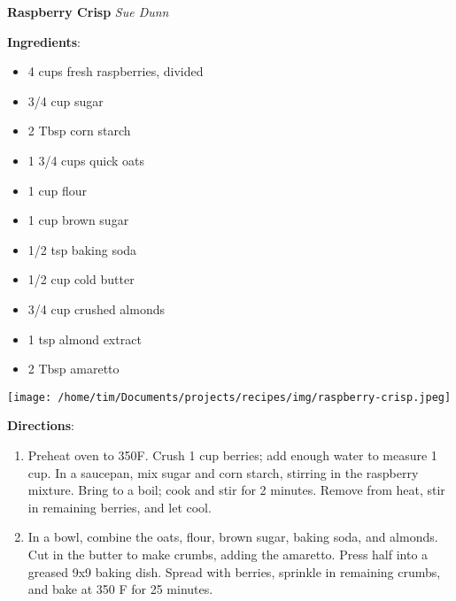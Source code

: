\documentclass[11pt, twoside, openany]{book}
\begin{document}
\noindent\begin{minipage}[t]{\linewidth}%
{\Large\textbf{Raspberry Crisp}} \label{raspberry-crisp}\hfill\textit{Sue Dunn}\\
\noindent\begin{minipage}[t]{0.78\linewidth}%
\textbf{Ingredients}:\vspace{-3mm}
\begin{multicols}{2}
\begin{itemize}\setlength\itemsep{-1mm}
\item 4 cups fresh raspberries, divided
\item 3/4 cup sugar
\item 2 Tbsp corn starch
\item 1 3/4 cups quick oats
\item 1 cup flour
\item 1 cup brown sugar
\item 1/2 tsp baking soda
\item 1/2 cup cold butter
\item 3/4 cup crushed almonds
\item 1 tsp almond extract
\item 2 Tbsp amaretto
\end{itemize}
\end{multicols}
\end{minipage}
\noindent\begin{minipage}[t]{0.18\linewidth}
\centering \strut\vspace*{-\baselineskip}\newline
\texttt{[image: /home/tim/Documents/projects/recipes/img/raspberry-crisp.jpeg]}\\
\end{minipage}\vspace{3mm}
\textbf{Directions}:
\vspace{-3mm}\begin{enumerate}\setlength\itemsep{-1mm}
\item Preheat oven to 350F. Crush 1 cup berries; add enough water to measure 1 cup. In a saucepan, mix sugar and corn starch, stirring in the raspberry mixture. Bring to a boil; cook and stir for 2 minutes. Remove from heat, stir in remaining berries, and let cool.
\item In a bowl, combine the oats, flour, brown sugar, baking soda, and almonds. Cut in the butter to make crumbs, adding the amaretto. Press half into a greased 9x9 baking dish. Spread with berries, sprinkle in remaining crumbs, and bake at 350 F for 25 minutes.
\end{enumerate}
\end{minipage}\vspace{8mm}
\end{document}

